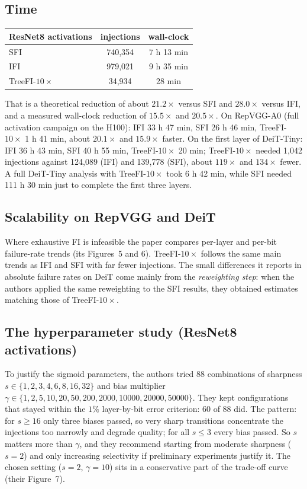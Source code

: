 \subsection{Time}
\begin{center}
\small
\begin{tabular}{lcc}
\toprule
ResNet8 activations & injections & wall-clock \\
\midrule
SFI & 740{,}354 & 7 h 13 min \\
IFI & 979{,}021 & 9 h 35 min \\
TreeFI-$10\times$ & 34{,}934 & 28 min \\
\bottomrule
\end{tabular}
\end{center}
That is a theoretical reduction of about $21.2\times$ versus SFI and $28.0\times$ versus IFI, and a measured wall-clock reduction of $15.5\times$ and $20.5\times$. On RepVGG-A0 (full activation campaign on the H100): IFI 33 h 47 min, SFI 26 h 46 min,
TreeFI-$10\times$ 1 h 41 min, about $20.1\times$ and $15.9\times$ faster. On the first layer of DeiT-Tiny: IFI 36 h 43 min, SFI 40 h 55 min, TreeFI-$10\times$ 20 min; TreeFI-$10\times$ needed 1{,}042 injections against 124{,}089 (IFI) and 139{,}778 (SFI), about $119\times$ and $134\times$ fewer.
A full DeiT-Tiny analysis with TreeFI-$10\times$ took 6 h 42 min, while SFI needed 111 h 30 min just to complete the first three layers.

\subsection{Scalability on RepVGG and DeiT}
Where exhaustive FI is infeasible the paper compares per-layer and per-bit failure-rate trends (its Figures~5 and 6). TreeFI-$10\times$ follows the same main trends as IFI and SFI with far fewer injections. The small differences it reports in absolute failure rates on DeiT come mainly from the \emph{reweighting step}:
when the authors applied the same reweighting to the SFI results, they obtained estimates matching those of TreeFI-$10\times$.

\subsection{The hyperparameter study (ResNet8 activations)}
To justify the sigmoid parameters, the authors tried $88$ combinations of sharpness $s\in\{1,2,3,4,6,8,16,32\}$ and bias multiplier $\gamma\in\{1,2,5,10,20,50,200,2000,10000,20000,50000\}$. They kept configurations that stayed within the $1\%$ layer-by-bit error criterion:
$60$ of $88$ did. The pattern: for $s\ge16$ only three biases passed, so very sharp transitions concentrate the injections too narrowly and degrade quality; for all $s\le3$ every bias passed. So $s$ matters more than $\gamma$, and they recommend starting from moderate sharpness ($s=2$) and only increasing selectivity if preliminary
experiments justify it. The chosen setting ($s=2$, $\gamma=10$) sits in a conservative part of the trade-off curve (their Figure~7).

